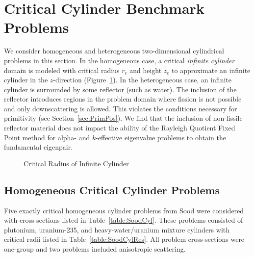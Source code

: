 \section{Critical Cylinder Benchmark Problems}

We consider homogeneous and heterogeneous two-dimensional cylindrical problems in this section. In the homogeneous case, a critical \textit{infinite cylinder} domain is modeled with critical radius $r_{c}$ and height $z_{c}$ to approximate an infinite cylinder in the $z$-direction (Figure~\ref{fig:CylCritRadius}). In the heterogeneous case, an infinite cylinder is surrounded by some reflector (such as water). The inclusion of the reflector introduces regions in the problem domain where fission is not possible and only downscattering is allowed. This violates the conditions necessary for primitivity (see Section~\ref{sec:PrimPos}). We find that the inclusion of non-fissile reflector material does not impact the ability of the Rayleigh Quotient Fixed Point method for alpha- and $k$-effective eigenvalue problems to obtain the fundamental eigenpair.

\begin{figure}[!htbp]
	\centering
	
	\caption{Critical Radius of Infinite Cylinder}
	\label{fig:CylCritRadius}
\end{figure}

\subsection{Homogeneous Critical Cylinder Problems}

Five exactly critical homogeneous cylinder problems from Sood \cite{sood2003analytical} were considered with cross sections listed in Table~\ref{table:SoodCyl}. These problems consisted of plutonium, uranium-235, and heavy-water/uranium mixture cylinders with critical radii listed in Table~\ref{table:SoodCylRes}. All problem cross-sections were one-group and two problems included anisotropic scattering.

